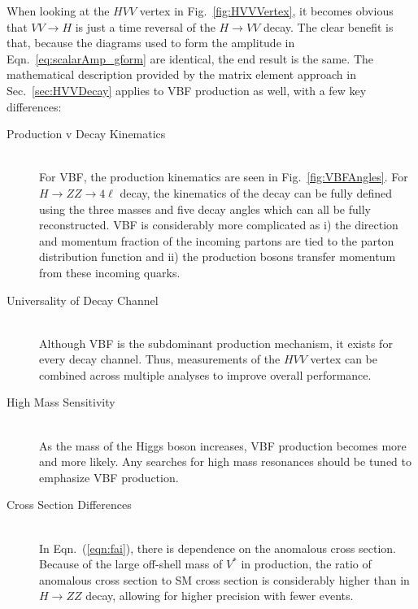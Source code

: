 When looking at the $HVV$ vertex in Fig.~\ref{fig:HVVVertex}, it becomes obvious that $VV\rightarrow H$ is just a time reversal of the $H\rightarrow VV$ decay. The clear benefit is that, because the diagrams used to form the amplitude in Eqn.~\ref{eq:scalarAmp_gform} are identical, the end result is the same. The mathematical description provided by the matrix element approach in Sec.~\ref{sec:HVVDecay} applies to VBF production as well, with a few key differences:

\begin{description}
\item[Production v Decay Kinematics] \hfill \\
For VBF, the production kinematics are seen in Fig.~\ref{fig:VBFAngles}. For $H\rightarrow ZZ \rightarrow 4\ell$ decay, the kinematics of the decay can be fully defined using the three masses and five decay angles which can all be fully reconstructed. VBF is considerably more complicated as i) the direction and momentum fraction of the incoming partons are tied to the parton distribution function and ii) the production bosons transfer momentum from these incoming quarks.
\item[Universality of Decay Channel] \hfill \\
Although VBF is the subdominant production mechanism, it exists for every decay channel. Thus, measurements of the $HVV$ vertex can be combined across multiple analyses to improve overall performance.
\item[High Mass Sensitivity] \hfill \\
As the mass of the Higgs boson increases, VBF production becomes more and more likely. Any searches for high mass resonances should be tuned to emphasize VBF production.
\item[Cross Section Differences] \hfill \\
In Eqn.~(\ref{eqn:fai}), there is dependence on the anomalous cross section. Because of the large off-shell mass of $V^*$ in production, the ratio of anomalous cross section to SM cross section is considerably higher than in $H\rightarrow ZZ$ decay, allowing for higher precision with fewer events.
\end{description}

